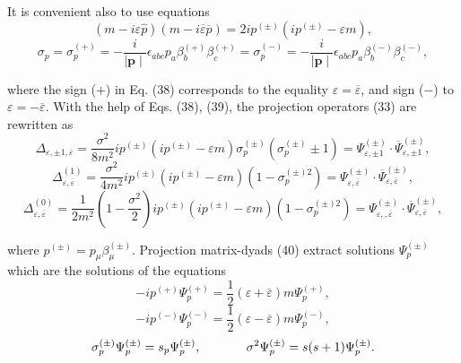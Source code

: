 \documentclass[a4paper,12pt]{article}
\begin{document}
It is convenient also to use equations
\begin{equation}
\left( m-i\varepsilon \widehat{p}\right) \left(
m-i\overline{\varepsilon } \overline{p}\right) =2ip^{(\pm )}\left(
ip^{(\pm )}-\varepsilon m\right) ,\label{38}
\end{equation}
\begin{equation}
\sigma _p=\sigma _p^{(+)}=-\frac i{\mid \mathbf{p}\mid }\epsilon
_{abc}p_a\beta _b^{(+)}\beta _c^{(+)}=\sigma _p^{(-)}=-\frac
i{\mid \mathbf{p }\mid }\epsilon _{abc}p_a\beta _b^{(-)}\beta
_c^{(-)} , \label{39}
\end{equation}

where the sign ($+$) in Eq. (38) corresponds to the equality
$\varepsilon = \overline{\varepsilon }$, and sign ($-$) to
$\varepsilon =-\overline{ \varepsilon }$. With the help of Eqs.
(38), (39), the projection operators (33) are rewritten as
\[
\Delta _{\varepsilon ,\pm 1,\overline{\varepsilon }}=\frac{\sigma
^2}{8m^2} ip^{(\pm )}\left( ip^{(\pm )}-\varepsilon m\right)
\sigma _p^{(\pm )}\left( \sigma _p^{(\pm )}\pm 1\right) =\Psi
_{\varepsilon ,\pm 1}^{(\pm )}\cdot \overline{\Psi }_{\varepsilon
,\pm 1}^{(\pm )} ,
\]
\begin{equation}
\Delta _{\varepsilon ,\overline{\varepsilon }}^{(1)}=\frac{\sigma
^2}{4m^2} ip^{(\pm )}\left( ip^{(\pm )}-\varepsilon m\right)
\left( 1-\sigma _p^{(\pm )2}\right) =\Psi _{\varepsilon
,\overline{\varepsilon }}^{(\pm )}\cdot \overline{\Psi
}_{\varepsilon ,\overline{\varepsilon }}^{(\pm )} ,\label{40}
\end{equation}
\[
\Delta _{\varepsilon ,\overline{\varepsilon }}^{(0)}=\frac
1{2m^2}\left( 1- \frac{\sigma ^2}2\right) ip^{(\pm )}\left(
ip^{(\pm )}-\varepsilon m\right) \left( 1-\sigma _p^{(\pm
)2}\right) =\Psi _{\varepsilon ,,\overline{ \varepsilon }}^{(\pm
)}\cdot \overline{\Psi }_{\varepsilon ,\overline{ \varepsilon
}}^{(\pm )} ,
\]

where $p^{(\pm )}=p_\mu \beta _\mu ^{(\pm )}.$ Projection matrix-dyads (40)
extract solutions $\Psi _p^{(\pm )}$ which are the solutions of the
equations
\begin{equation}
-ip^{(+)}\Psi _p^{(+)}=\frac 12\left( \varepsilon
+\overline{\varepsilon } \right) m\Psi _p^{(+)} , \label{41}
\end{equation}
\begin{equation}
-ip^{(-)}\Psi _p^{(-)}=\frac 12\left( \varepsilon
-\overline{\varepsilon } \right) m\Psi _p^{(-)} , \label{42}
\end{equation}
\begin{equation}
\sigma _p^{(\pm )}\Psi _p^{(\pm )}=s_p\Psi _p^{(\pm )} ,
\hspace{0.5in}\sigma ^2\Psi _p^{(\pm )}=s(s+1)\Psi _p^{(\pm )} .
\label{43}
\end{equation}
\end{document}
